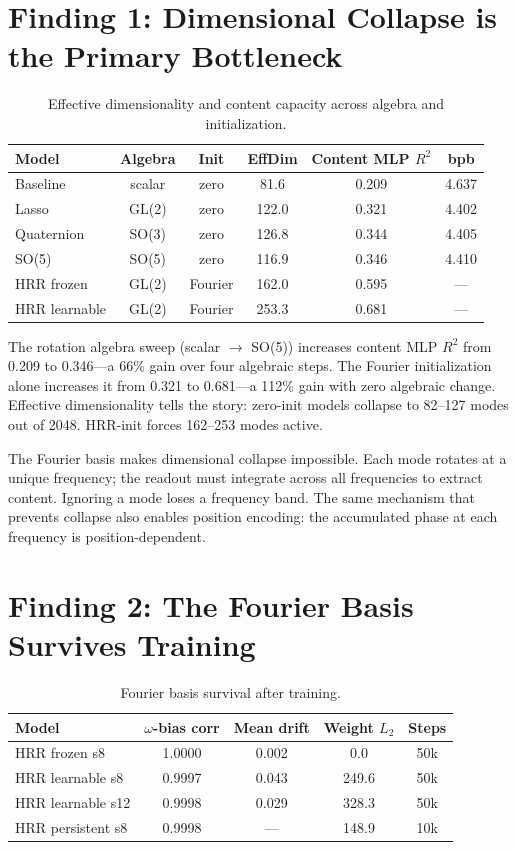 \documentclass[11pt,a4paper]{article}
\begin{document}
\section{Finding 1: Dimensional Collapse is the Primary Bottleneck}

\begin{table}[h]
\centering
\caption{Effective dimensionality and content capacity across algebra and initialization.}
\begin{tabular}{lccccc}
\toprule
Model & Algebra & Init & EffDim & Content MLP $R^2$ & bpb \\
\midrule
Baseline & scalar & zero & 81.6 & 0.209 & 4.637 \\
Lasso & GL(2) & zero & 122.0 & 0.321 & 4.402 \\
Quaternion & SO(3) & zero & 126.8 & 0.344 & 4.405 \\
SO(5) & SO(5) & zero & 116.9 & 0.346 & 4.410 \\
\midrule
HRR frozen & GL(2) & Fourier & 162.0 & 0.595 & --- \\
HRR learnable & GL(2) & Fourier & 253.3 & 0.681 & --- \\
\bottomrule
\end{tabular}
\end{table}

The rotation algebra sweep (scalar $\to$ SO(5)) increases content MLP $R^2$ from 0.209 to 0.346---a 66\% gain over four algebraic steps. The Fourier initialization alone increases it from 0.321 to 0.681---a 112\% gain with zero algebraic change. Effective dimensionality tells the story: zero-init models collapse to 82--127 modes out of 2048. HRR-init forces 162--253 modes active.

The Fourier basis makes dimensional collapse impossible. Each mode rotates at a unique frequency; the readout must integrate across all frequencies to extract content. Ignoring a mode loses a frequency band. The same mechanism that prevents collapse also enables position encoding: the accumulated phase at each frequency is position-dependent.

\section{Finding 2: The Fourier Basis Survives Training}

\begin{table}[h]
\centering
\caption{Fourier basis survival after training.}
\begin{tabular}{lcccc}
\toprule
Model & $\omega$-bias corr & Mean drift & Weight $L_2$ & Steps \\
\midrule
HRR frozen s8 & 1.0000 & 0.002 & 0.0 & 50k \\
HRR learnable s8 & 0.9997 & 0.043 & 249.6 & 50k \\
HRR learnable s12 & 0.9998 & 0.029 & 328.3 & 50k \\
HRR persistent s8 & 0.9998 & --- & 148.9 & 10k \\
\bottomrule
\end{tabular}
\end{table}
\end{document}
